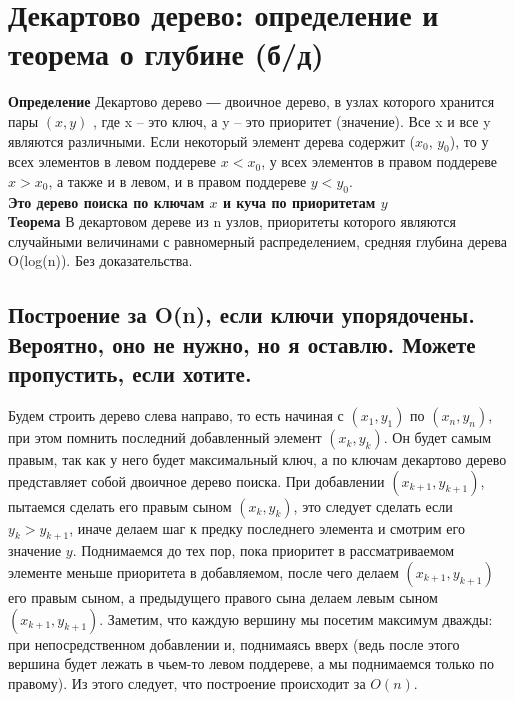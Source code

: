  
\newpage
\setcounter{section}{54}
\section{Декартово дерево: определение и теорема о глубине (б/д)}

\noindent\textbf{Определение} Декартово дерево ― двоичное дерево, в узлах которого
хранится пары $(x, y)$ , где x – это ключ, а y – это приоритет (значение). Все x и все y
являются различными. Если некоторый элемент дерева содержит ($x_0$, $y_0$),
то у всех элементов в левом поддереве $x < x_0$, у всех элементов в правом
поддереве $x > x_0$, а также и в левом, и в правом поддереве $y < y_0$.
\\

\textbf{Это дерево поиска по ключам $x$ и куча по приоритетам $y$}
\\

\noindent\textbf{Теорема} В декартовом дереве из n узлов, приоритеты которого являются случайными величинами с равномерный распределением, средняя глубина дерева O(log(n)). Без доказательства.


\subsection*{Построение за O(n), если ключи упорядочены. Вероятно, оно не нужно, но я оставлю. Можете пропустить, если хотите.}

\parbox[t]{0.95\linewidth}{
Будем строить дерево слева направо, то есть начиная с $(x_1, y_1)$ по $(x_n, y_n)$, при этом помнить последний добавленный элемент $(x_k, y_k)$. Он будет самым правым, так как у него будет максимальный ключ, а по ключам декартово дерево представляет собой двоичное дерево поиска. При добавлении $(x_{k+1}, y_{k+1})$, пытаемся сделать его правым сыном $(x_k, y_k)$, это следует сделать если $y_k > y_{k+1}$, иначе делаем шаг к предку последнего элемента и смотрим его значение $y$. Поднимаемся до тех пор, пока приоритет в рассматриваемом элементе меньше приоритета в добавляемом, после чего делаем $(x_{k+1}, y_{k+1})$ его правым сыном, а предыдущего правого сына делаем левым сыном $(x_{k+1}, y_{k+1})$.
\newline
Заметим, что каждую вершину мы посетим максимум дважды: при непосредственном добавлении и, поднимаясь вверх (ведь после этого вершина будет лежать в чьем-то левом поддереве, а мы поднимаемся только по правому). Из этого следует, что построение происходит за $O(n)$.
}

\setcounter{section}{55}
